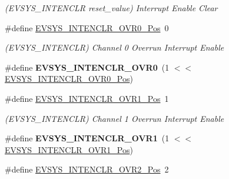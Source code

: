 \begin{DoxyCompactItemize}
\begin{DoxyCompactList}\small\item\em (E\+V\+S\+Y\+S\+\_\+\+I\+N\+T\+E\+N\+C\+L\+R reset\+\_\+value) Interrupt Enable Clear \end{DoxyCompactList}\item 
\hypertarget{group___s_a_m_l21___e_v_s_y_s_ga7be1d8ec8ebd796f7a965b29b44256b3}{}\#define \hyperlink{group___s_a_m_l21___e_v_s_y_s_ga7be1d8ec8ebd796f7a965b29b44256b3}{E\+V\+S\+Y\+S\+\_\+\+I\+N\+T\+E\+N\+C\+L\+R\+\_\+\+O\+V\+R0\+\_\+\+Pos}~0\label{group___s_a_m_l21___e_v_s_y_s_ga7be1d8ec8ebd796f7a965b29b44256b3}

\begin{DoxyCompactList}\small\item\em (E\+V\+S\+Y\+S\+\_\+\+I\+N\+T\+E\+N\+C\+L\+R) Channel 0 Overrun Interrupt Enable \end{DoxyCompactList}\item 
\hypertarget{group___s_a_m_l21___e_v_s_y_s_ga63b54e0793df11848d1ec5595e934b92}{}\#define {\bfseries E\+V\+S\+Y\+S\+\_\+\+I\+N\+T\+E\+N\+C\+L\+R\+\_\+\+O\+V\+R0}~(1 $<$$<$ \hyperlink{group___s_a_m_l21___e_v_s_y_s_ga7be1d8ec8ebd796f7a965b29b44256b3}{E\+V\+S\+Y\+S\+\_\+\+I\+N\+T\+E\+N\+C\+L\+R\+\_\+\+O\+V\+R0\+\_\+\+Pos})\label{group___s_a_m_l21___e_v_s_y_s_ga63b54e0793df11848d1ec5595e934b92}

\item 
\hypertarget{group___s_a_m_l21___e_v_s_y_s_ga0acf1039dffbb284b974ac3701124842}{}\#define \hyperlink{group___s_a_m_l21___e_v_s_y_s_ga0acf1039dffbb284b974ac3701124842}{E\+V\+S\+Y\+S\+\_\+\+I\+N\+T\+E\+N\+C\+L\+R\+\_\+\+O\+V\+R1\+\_\+\+Pos}~1\label{group___s_a_m_l21___e_v_s_y_s_ga0acf1039dffbb284b974ac3701124842}

\begin{DoxyCompactList}\small\item\em (E\+V\+S\+Y\+S\+\_\+\+I\+N\+T\+E\+N\+C\+L\+R) Channel 1 Overrun Interrupt Enable \end{DoxyCompactList}\item 
\hypertarget{group___s_a_m_l21___e_v_s_y_s_gafa933453bc8ec1c657467141d1d9ebe1}{}\#define {\bfseries E\+V\+S\+Y\+S\+\_\+\+I\+N\+T\+E\+N\+C\+L\+R\+\_\+\+O\+V\+R1}~(1 $<$$<$ \hyperlink{group___s_a_m_l21___e_v_s_y_s_ga0acf1039dffbb284b974ac3701124842}{E\+V\+S\+Y\+S\+\_\+\+I\+N\+T\+E\+N\+C\+L\+R\+\_\+\+O\+V\+R1\+\_\+\+Pos})\label{group___s_a_m_l21___e_v_s_y_s_gafa933453bc8ec1c657467141d1d9ebe1}

\item 
\hypertarget{group___s_a_m_l21___e_v_s_y_s_ga44ebcf12fed04a93c6caf4d3c6261210}{}\#define \hyperlink{group___s_a_m_l21___e_v_s_y_s_ga44ebcf12fed04a93c6caf4d3c6261210}{E\+V\+S\+Y\+S\+\_\+\+I\+N\+T\+E\+N\+C\+L\+R\+\_\+\+O\+V\+R2\+\_\+\+Pos}~2\label{group___s_a_m_l21___e_v_s_y_s_ga44ebcf12fed04a93c6caf4d3c6261210}


\end{DoxyCompactItemize}
